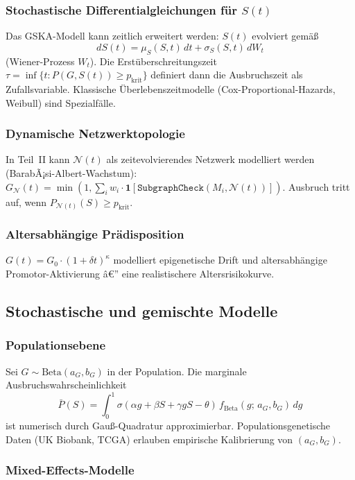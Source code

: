 ﻿\documentclass[12pt, a4paper]{article}
\theoremstyle{definition}
\theoremstyle{remark}
\newcommand{\calN}{\mathcal{N}}
\newcommand{\subgraphalg}{\mathtt{SubgraphCheck}}
\newcommand{\GN}{G_{\calN}}
\begin{document}
\subsubsection{Stochastische Differentialgleichungen für $S(t)$}

Das GSKA-Modell kann zeitlich erweitert werden: $S(t)$ evolviert gemäß
\[
  dS(t) = \mu_S(S,t)\,dt + \sigma_S(S,t)\,dW_t
\]
(Wiener-Prozess $W_t$). Die Erstüberschreitungszeit
$\tau = \inf\{t : P(G,S(t)) \geq p_{\mathrm{krit}}\}$ definiert dann
die Ausbruchszeit als Zufallsvariable. Klassische Überlebenszeitmodelle
(Cox-Proportional-Hazards, Weibull) sind Spezialfälle.

\subsubsection{Dynamische Netzwerktopologie}

In Teil~II kann $\calN(t)$ als zeitevolvierendes Netzwerk modelliert werden
(BarabÃ¡si-Albert-Wachstum):
$\GN(t) = \min(1, \sum_i w_i \cdot \mathbf{1}[\subgraphalg(M_i, \calN(t))])$.
Ausbruch tritt auf, wenn $P_{\calN(t)}(S) \geq p_{\mathrm{krit}}$.

\subsubsection{Altersabhängige Prädisposition}

$G(t) = G_0 \cdot (1+\delta t)^\kappa$ modelliert epigenetische Drift und
altersabhängige Promotor-Aktivierung â€” eine realistischere Altersrisikokurve.

\subsection{Stochastische und gemischte Modelle}

\subsubsection{Populationsebene}

Sei $G \sim \mathrm{Beta}(a_G, b_G)$ in der Population. Die marginale Ausbruchswahrscheinlichkeit
\[
  \bar{P}(S) = \int_0^1 \sigma(\alpha g + \beta S + \gamma g S - \theta)\,
  f_{\mathrm{Beta}}(g;\,a_G,b_G)\,dg
\]
ist numerisch durch Gauß-Quadratur approximierbar. Populationsgenetische Daten
(UK Biobank, TCGA) erlauben empirische Kalibrierung von $(a_G, b_G)$.

\subsubsection{Mixed-Effects-Modelle}
\end{document}

